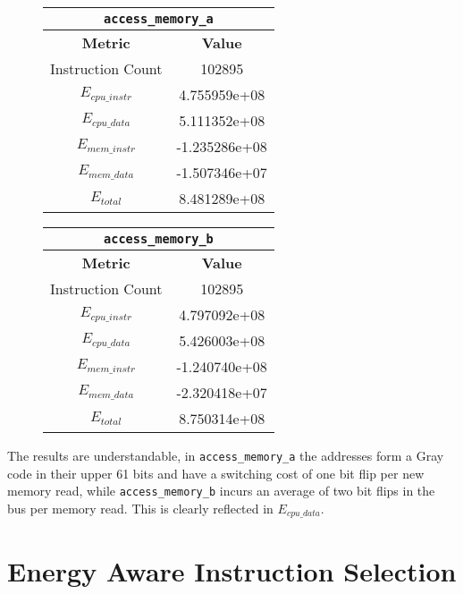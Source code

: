 \begin{figure}[htbp]
  \centering

  \begin{tabular}{ | c | c | }
    \hline
    \multicolumn{2}{|c|}{\texttt{access\_memory\_a}} \\
    \hline

    \textbf{Metric} & \textbf{Value} \\
    \hline

    Instruction Count &  102895 \\
    $E_{cpu\_instr}$ & 4.755959e+08 \\
    $E_{cpu\_data}$ & 5.111352e+08 \\
    $E_{mem\_instr}$ &  -1.235286e+08 \\
    $E_{mem\_data}$ & -1.507346e+07 \\
    $E_{total}$ & 8.481289e+08 \\
    \hline
  \end{tabular}
  \quad
  \begin{tabular}{ | c | c | }
    \hline
    \multicolumn{2}{|c|}{\texttt{access\_memory\_b}} \\
    \hline

    \textbf{Metric} & \textbf{Value} \\
    \hline

    Instruction Count &  102895 \\
    $E_{cpu\_instr}$ &  4.797092e+08 \\
    $E_{cpu\_data}$ &  5.426003e+08 \\
    $E_{mem\_instr}$ &  -1.240740e+08 \\
    $E_{mem\_data}$ &  -2.320418e+07 \\
    $E_{total}$ & 8.750314e+08 \\
    \hline
  \end{tabular}

\end{figure}

The results are understandable, in \texttt{access\_memory\_a} the
addresses form a Gray code in their upper 61 bits and have a switching
cost of one bit flip per new memory read, while
\texttt{access\_memory\_b} incurs an average of two bit flips in the
bus per memory read.  This is clearly reflected in $E_{cpu\_data}$.

\section{Energy Aware Instruction Selection}

